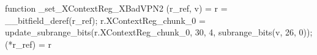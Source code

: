 function _set_XContextReg_XBadVPN2 (r_ref, v) = {
    r = __bitfield_deref(r_ref);
    r.XContextReg_chunk_0 = update_subrange_bits(r.XContextReg_chunk_0, 30, 4, subrange_bits(v, 26, 0));
    (*r_ref) = r
}
